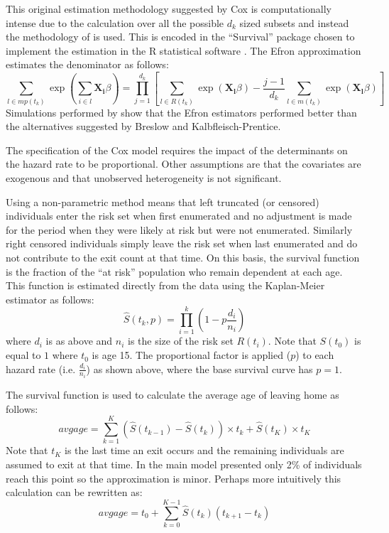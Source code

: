 \documentclass[12pt]{article}
\begin{document}
This original estimation methodology suggested by Cox is computationally intense due to the calculation over all the possible $d_k$ sized subsets and instead the methodology of \cite{efron1977efficiency} is used. This is encoded in the ``Survival'' package chosen to implement the estimation in the R statistical software \parencite{survival}. The Efron approximation estimates the denominator as follows:
\[  \sum_{l \in mp(t_k)}\exp \left( \sum_{i \in l}\mathbf{X_i}  \beta \right) = \prod_{j=1}^{d_k}\left[\sum_{l \in R(t_k)}\exp(\mathbf{X_l}\beta) - \frac{j-1}{d_k}\sum_{l \in m(t_k)} \exp (\mathbf{X_l}\beta) \right] \]
Simulations performed by \cite{hertz1997validity} show that the Efron estimators performed better than the alternatives suggested by Breslow and Kalbfleisch-Prentice.

The specification of the Cox model requires the impact of the determinants on the hazard rate to be proportional. Other assumptions are that the covariates are exogenous and that unobserved heterogeneity is not significant.

Using a non-parametric method means that left truncated (or censored) individuals enter the risk set when first enumerated and no adjustment is made for the period when they were likely at risk but were not enumerated. Similarly right censored individuals simply leave the risk set when last enumerated and do not contribute to the exit count at that time. On this basis, the survival function is the fraction of the ``at risk'' population who remain dependent at each age. This function is estimated directly from the data using the Kaplan-Meier estimator as follows:
\[ \hat{S}(t_k, p)= \prod_{i=1}^k \left(1-{p \frac {d_i}{n_i}}\right) \]
where $d_i$ is as above and $n_i$ is the size of the risk set $R(t_i)$. Note that $S(t_0)$ is equal to $1$ where $t_0$ is age 15. The proportional factor is applied ($p$) to each hazard rate (i.e. $\frac {d_i}{n_i}$) as shown above, where the base survival curve has $p=1$.

The survival function is used to calculate the average age of leaving home as follows:
\begin{equation*}
  avgage = \sum_{k = 1}^K (\hat{S}(t_{k-1})-\hat{S}(t_{k})) \times t_k + \hat{S}(t_K) \times t_K
\end{equation*}
Note that $t_K$ is the last time an exit occurs and the remaining individuals are assumed to exit at that time. In the main model presented only 2\% of individuals reach this point so the approximation is minor. Perhaps more intuitively this calculation can be rewritten as:
\begin{equation*}
  avgage = t_0 + \sum_{k = 0}^{K-1} \hat{S}(t_{k})(t_{k+1} - t_{k})
\end{equation*}
\end{document}
